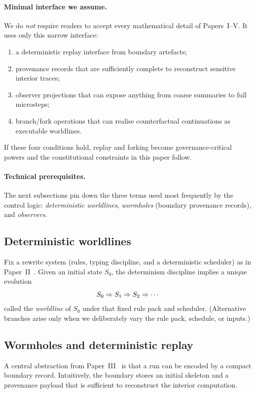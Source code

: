 \documentclass[11pt]{article}
\theoremstyle{definition}
\theoremstyle{plain}
\theoremstyle{remark}
\DeclareRobustCommand{\WARP}{\ifmmode\mathit{WARP}\else{\upshape\scshape warp}\fi}
\begin{document}
\paragraph{Minimal interface we assume.}
We do \emph{not} require readers to accept every mathematical detail of Papers~I--V.
It uses only this narrow interface:
\begin{enumerate}[leftmargin=*]
  \item a deterministic replay interface from boundary artefacts;
  \item provenance records that are sufficiently complete to reconstruct sensitive interior traces;
  \item observer projections that can expose anything from coarse summaries to full microsteps;
  \item branch/fork operations that can realise counterfactual continuations as executable worldlines.
\end{enumerate}
If these four conditions hold, replay and forking become governance-critical powers and the constitutional
constraints in this paper follow.

\paragraph{Technical prerequisites.}
The next subsections pin down the three terms used most frequently by the control logic:
\emph{deterministic worldlines}, \emph{wormholes} (boundary provenance records), and \emph{observers}.

\subsection{Deterministic worldlines}
Fix a \WARP{} rewrite system (rules, typing discipline, and a deterministic scheduler) as in
Paper~II~\cite{ross_paper_ii}.
Given an initial state $S_0$, the determinism discipline implies a unique evolution
\[
  S_0 \Rightarrow S_1 \Rightarrow S_2 \Rightarrow \cdots
\]
called the \emph{worldline} of $S_0$ under that fixed rule pack and scheduler.
(Alternative branches arise only when we deliberately vary the rule pack, schedule, or inputs.)

\subsection{Wormholes and deterministic replay}
\label{sec:wormholes}

A central abstraction from Paper~III~\cite{ross_paper_iii} is that a run can be encoded by a compact boundary record.
Intuitively, the boundary stores an initial skeleton and a provenance payload that is sufficient to
reconstruct the interior computation.
\end{document}
